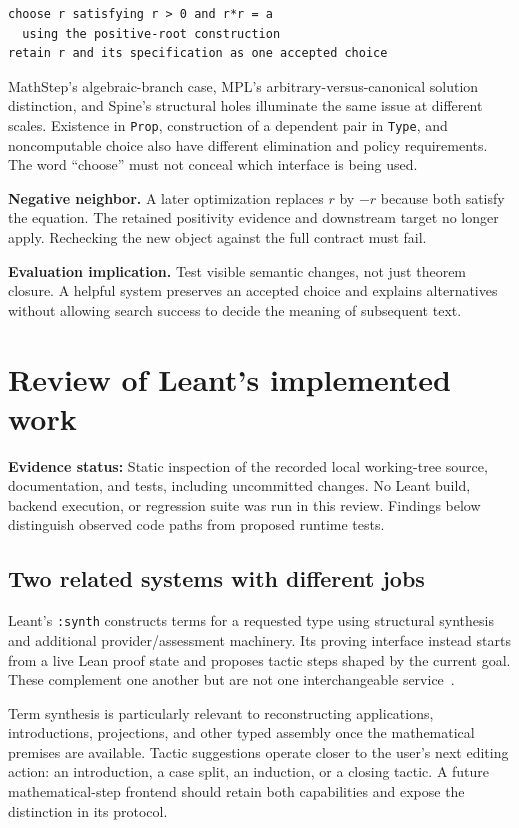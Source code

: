 \documentclass[11pt,letterpaper]{article}
\newcommand{\code}[1]{\nolinkurl{#1}}
\newcommand{\status}[1]{\textbf{Evidence status:} #1}
\begin{document}
\begin{lstlisting}
choose r satisfying r > 0 and r*r = a
  using the positive-root construction
retain r and its specification as one accepted choice
\end{lstlisting}

MathStep's algebraic-branch case, MPL's arbitrary-versus-canonical solution
distinction, and Spine's structural holes illuminate the same issue at different
scales. Existence in \code{Prop}, construction of a dependent pair in \code{Type},
and noncomputable choice also have different elimination and policy requirements.
The word ``choose'' must not conceal which interface is being used.

\textbf{Negative neighbor.} A later optimization replaces \(r\) by \(-r\) because
both satisfy the equation. The retained positivity evidence and downstream target
no longer apply. Rechecking the new object against the full contract must fail.

\textbf{Evaluation implication.} Test visible semantic changes, not just theorem
closure. A helpful system preserves an accepted choice and explains alternatives
without allowing search success to decide the meaning of subsequent text.

\section{Review of Leant's implemented work}\label{sec:leant}
\status{Static inspection of the recorded local working-tree source, documentation,
and tests, including uncommitted changes. No Leant build, backend execution, or regression suite was
run in this review. Findings below distinguish observed code paths from proposed
runtime tests.}

\subsection{Two related systems with different jobs}
Leant's \code{:synth} constructs terms for a requested type using structural
synthesis and additional provider/assessment machinery. Its proving interface
instead starts from a live Lean proof state and proposes tactic steps shaped by
the current goal. These complement one another but are not one interchangeable
service~\cite{l-readme,l-main}.

Term synthesis is particularly relevant to reconstructing applications,
introductions, projections, and other typed assembly once the mathematical
premises are available. Tactic suggestions operate closer to the user's next
editing action: an introduction, a case split, an induction, or a closing tactic.
A future mathematical-step frontend should retain both capabilities and expose
the distinction in its protocol.
\end{document}
